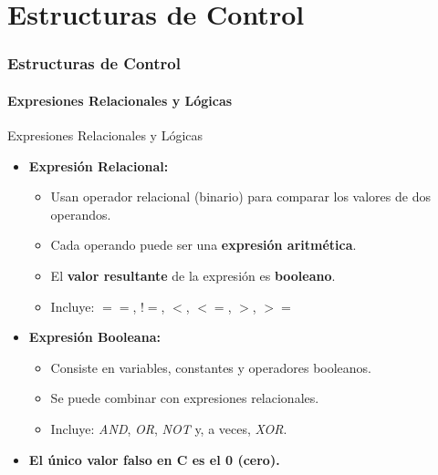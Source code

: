 \documentclass{beamer}
\begin{document}

\part{Estructuras de Control}
\section{Estructuras de Control}

\subsection{Expresiones Relacionales y Lógicas}
\begin{frame}[fragile]{Expresiones Relacionales y Lógicas}
\begin{itemize}
	\item \textbf{Expresión Relacional:} 
	\begin{itemize}
		\item Usan operador relacional (binario) para comparar los valores de dos operandos. 
		\item Cada operando puede ser una \textbf{expresión aritmética}.
		\item El \textbf{valor resultante} de la expresión es \textbf{booleano}.
		\item Incluye: $==$, $!=$, $<$, $<=$, $>$, $>=$
	\end{itemize}
	\item \textbf{Expresión Booleana:}  
	\begin{itemize}
		\item Consiste en variables, constantes y operadores booleanos.
		\item Se puede combinar con expresiones relacionales.
		\item Incluye: \emph{AND}, \emph{OR}, \emph{NOT} y, a veces, \emph{XOR}.
	\end{itemize}
	\item \textbf{El único valor falso en C es el 0 (cero).}
\end{itemize}
\end{frame}
\end{document}
